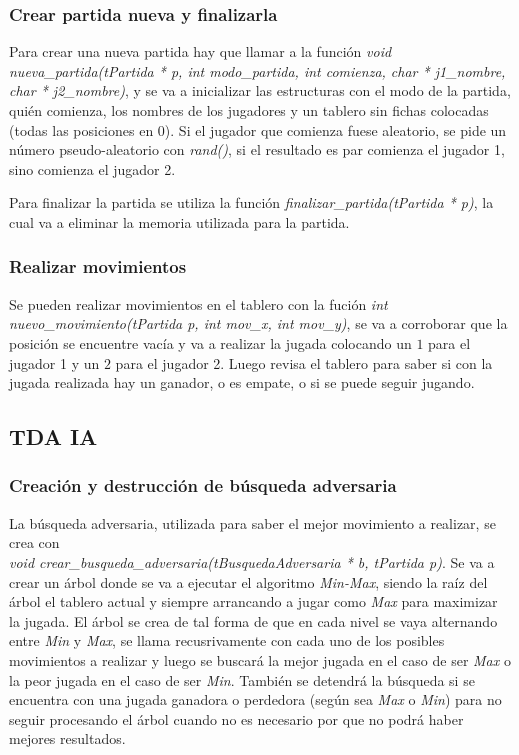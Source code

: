 \documentclass[12pt,a4paper]{article}
\begin{document}
\subsubsection{Crear partida nueva y finalizarla}
Para crear una nueva partida hay que llamar a la funci\'on \emph{void nueva\_partida(tPartida * p, int modo\_partida, int comienza, char * j1\_nombre, char * j2\_nombre)}, y se va a inicializar las estructuras con el modo de la partida, qui\'en comienza, los nombres de los jugadores y un tablero sin fichas colocadas (todas las posiciones en $0$). Si el jugador que comienza fuese aleatorio, se pide un n\'umero pseudo-aleatorio con \emph{rand()}, si el resultado es par comienza el jugador 1, sino comienza el jugador 2.

Para finalizar la partida se utiliza la funci\'on \emph{finalizar\_partida(tPartida * p)}, la cual va a eliminar la memoria utilizada para la partida.

\subsubsection{Realizar movimientos}
Se pueden realizar movimientos en el tablero con la fuci\'on \emph{int nuevo\_movimiento(tPartida p, int mov\_x, int mov\_y)}, se va a corroborar que la posici\'on se encuentre vac\'ia y va a realizar la jugada colocando un $1$ para el jugador 1 y un $2$ para el jugador 2. Luego revisa el tablero para saber si con la jugada realizada hay un ganador, o es empate, o si se puede seguir jugando.

\subsection{TDA IA}
\subsubsection{Creaci\'on y destrucci\'on de b\'usqueda adversaria}
La b\'usqueda adversaria, utilizada para saber el mejor movimiento a realizar, se crea con \\\emph{void crear\_busqueda\_adversaria(tBusquedaAdversaria * b, tPartida p)}. Se va a crear un \'arbol donde se va a ejecutar el algoritmo \emph{Min-Max}, siendo la ra\'iz del \'arbol el tablero actual y siempre arrancando a jugar como \emph{Max} para maximizar la jugada. El \'arbol se crea de tal forma de que en cada nivel se vaya alternando entre \emph{Min} y \emph{Max}, se llama recusrivamente con cada uno de los posibles movimientos a realizar y luego se buscar\'a la mejor jugada en el caso de ser \emph{Max} o la peor jugada en el caso de ser \emph{Min}. Tambi\'en se detendr\'a la b\'usqueda si se encuentra con una jugada ganadora o perdedora (seg\'un sea \emph{Max} o \emph{Min}) para no seguir procesando el \'arbol cuando no es necesario por que no podr\'a haber mejores resultados.
\end{document}
